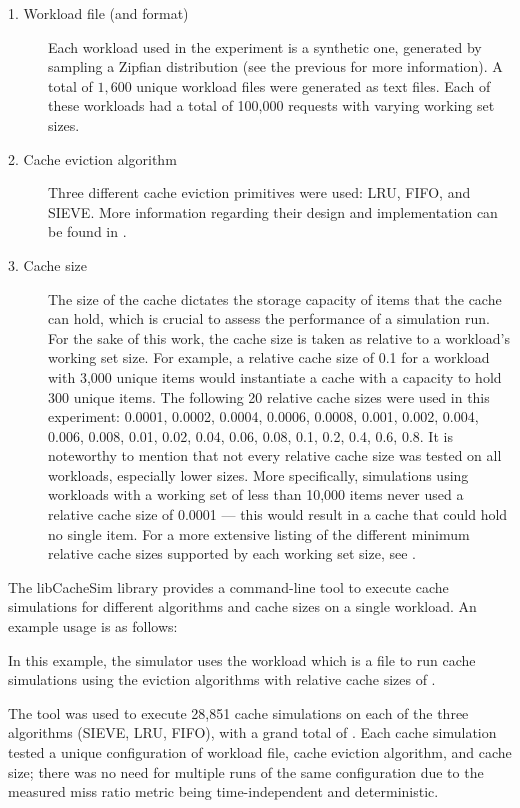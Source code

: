 \begin{description}
    \item [1. Workload file (and format)] Each workload used in the experiment is a synthetic one, generated by sampling a Zipfian distribution (see the previous  for more information). A total of $1,600$ unique workload files were generated as text files. Each of these workloads had a total of 100,000 requests with varying working set sizes.
    \item [2. Cache eviction algorithm] Three different cache eviction primitives were used: LRU, FIFO, and SIEVE. More information regarding their design and implementation can be found in .
    \item [3. Cache size] The size of the cache dictates the storage capacity of items that the cache can hold, which is crucial to assess the performance of a simulation run. For the sake of this work, the cache size is taken as relative to a workload's working set size. For example, a relative cache size of 0.1 for a workload with 3,000 unique items would instantiate a cache with a capacity to hold 300 unique items. The following 20 relative cache sizes were used in this experiment: 0.0001, 0.0002, 0.0004, 0.0006, 0.0008, 0.001, 0.002, 0.004, 0.006, 0.008, 0.01, 0.02, 0.04, 0.06, 0.08, 0.1, 0.2, 0.4, 0.6, 0.8. It is noteworthy to mention that not every relative cache size was tested on all workloads, especially lower sizes. More specifically, simulations using workloads with a working set of less than 10,000 items never used a relative cache size of 0.0001 — this would result in a cache that could hold no single item. For a more extensive listing of the different minimum relative cache sizes supported by each working set size, see .
\end{description}

The libCacheSim library provides a command-line tool to execute cache simulations for different algorithms and cache sizes on a single workload. An example usage is as follows:



In this example, the simulator  uses the workload  which is a  file to run cache simulations using the eviction algorithms  with relative cache sizes of .

The  tool was used to execute 28,851 cache simulations on each of the three algorithms (SIEVE, LRU, FIFO), with a grand total of . Each cache simulation tested a unique configuration of workload file, cache eviction algorithm, and cache size; there was no need for multiple runs of the same configuration due to the measured miss ratio metric being time-independent and deterministic.

